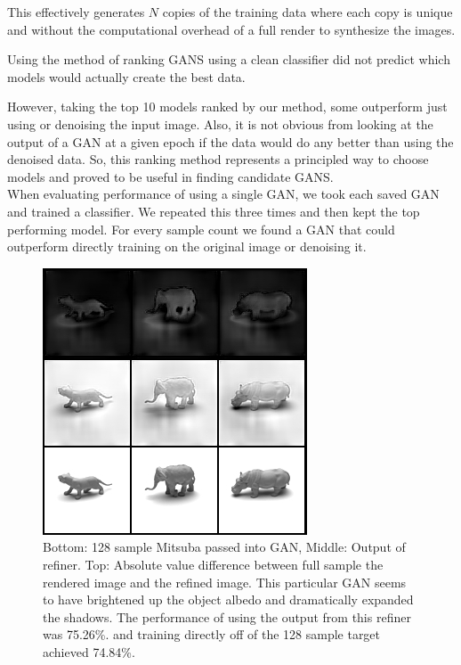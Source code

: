 \documentclass[10pt,twocolumn,letterpaper]{article}
\begin{document}
This effectively generates $N$ copies of the training data where each copy is unique and without the computational overhead of a full render to synthesize the images.

Using the method of ranking GANS using a clean classifier did not predict which models would actually create the best data. 

However, taking the top 10 models ranked by our method, some outperform just using or denoising the input image.  Also, it is not obvious from looking at the output of a GAN at a given epoch if the data would do any better than using the denoised data.  So, this ranking method represents a principled way to choose models and proved to be useful in finding candidate GANS.\\

When evaluating performance of using a single GAN, we took each saved GAN and trained a classifier.  We repeated this three times and then kept the top performing model.   For every sample count we found a GAN that could outperform directly training on the original image or denoising it.\\

\begin{figure}[h!]
\centering
\includegraphics[width=1.0\columnwidth]{./assets/128sampleGANComparison_75_26.png}
\caption{Bottom: 128 sample Mitsuba passed into GAN, Middle: Output of refiner.  Top: Absolute value difference between full sample the rendered image and the refined image. This particular GAN seems to have brightened up the object albedo and dramatically expanded the shadows.  The performance of using the output from this refiner was 75.26\%. and training directly off of the 128 sample target achieved 74.84\%.}
\label{fig:GAN_128}
\end{figure}
\end{document}
